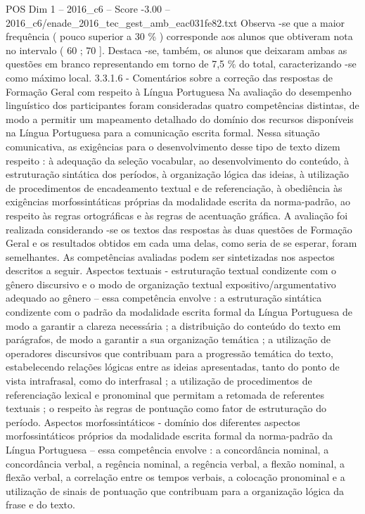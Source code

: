 \begin{textsample}{POS Dim 1 – 2016\_c6 – Score -3.00 – 2016\_c6/enade\_2016\_tec\_gest\_amb\_eac031fe82.txt}
Observa -se que a maior frequência ( pouco superior a 30 \% ) corresponde aos alunos que obtiveram nota no intervalo ( 60 ; 70 ].
Destaca -se, também, os alunos que deixaram ambas as questões em branco representando em torno de 7,5 \% do total, caracterizando -se como máximo local. 3.3.1.6 - Comentários sobre a correção das respostas de Formação Geral com respeito à Língua Portuguesa Na avaliação do desempenho linguístico dos participantes foram consideradas quatro competências distintas, de modo a permitir um mapeamento detalhado do domínio dos recursos disponíveis na Língua Portuguesa para a comunicação escrita formal.
Nessa situação comunicativa, as exigências para o desenvolvimento desse tipo de texto dizem respeito : à adequação da seleção vocabular, ao desenvolvimento do conteúdo, à estruturação sintática dos períodos, à organização lógica das ideias, à utilização de procedimentos de encadeamento textual e de referenciação, à obediência às exigências morfossintáticas próprias da modalidade escrita da norma-padrão, ao respeito às regras ortográficas e às regras de acentuação gráfica.
A avaliação foi realizada considerando -se os textos das respostas às duas questões de Formação Geral e os resultados obtidos em cada uma delas, como seria de se esperar, foram semelhantes.
As competências avaliadas podem ser sintetizadas nos aspectos descritos a seguir.
Aspectos textuais - estruturação textual condizente com o gênero discursivo e o modo de organização textual expositivo/argumentativo adequado ao gênero – essa competência envolve : a estruturação sintática condizente com o padrão da modalidade escrita formal da Língua Portuguesa de modo a garantir a clareza necessária ; a distribuição do conteúdo do texto em parágrafos, de modo a garantir a sua organização temática ; a utilização de operadores discursivos que contribuam para a progressão temática do texto, estabelecendo relações lógicas entre as ideias apresentadas, tanto do ponto de vista intrafrasal, como do interfrasal ; a utilização de procedimentos de referenciação lexical e pronominal que permitam a retomada de referentes textuais ; o respeito às regras de pontuação como fator de estruturação do período.
Aspectos morfossintáticos - domínio dos diferentes aspectos morfossintáticos próprios da modalidade escrita formal da norma-padrão da Língua Portuguesa – essa competência envolve : a concordância nominal, a concordância verbal, a regência nominal, a regência verbal, a flexão nominal, a flexão verbal, a correlação entre os tempos verbais, a colocação pronominal e a utilização de sinais de pontuação que contribuam para a organização lógica da frase e do texto.

\end{textsample}
